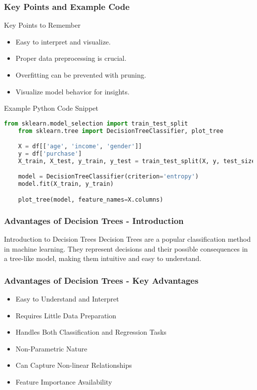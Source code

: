 \documentclass[aspectratio=169]{beamer}
\begin{document}
\begin{frame}[fragile]
    \frametitle{Key Points and Example Code}
    \begin{block}{Key Points to Remember}
        \begin{itemize}
            \item Easy to interpret and visualize.
            \item Proper data preprocessing is crucial.
            \item Overfitting can be prevented with pruning.
            \item Visualize model behavior for insights.
        \end{itemize}
    \end{block}

    \begin{block}{Example Python Code Snippet}
    \begin{lstlisting}[language=Python]
    from sklearn.model_selection import train_test_split
    from sklearn.tree import DecisionTreeClassifier, plot_tree

    X = df[['age', 'income', 'gender']]
    y = df['purchase']
    X_train, X_test, y_train, y_test = train_test_split(X, y, test_size=0.3, random_state=42)

    model = DecisionTreeClassifier(criterion='entropy')
    model.fit(X_train, y_train)

    plot_tree(model, feature_names=X.columns)
    \end{lstlisting}
    \end{block}
\end{frame}

\begin{frame}[fragile]
    \frametitle{Advantages of Decision Trees - Introduction}
    \begin{block}{Introduction to Decision Trees}
        Decision Trees are a popular classification method in machine learning. They represent decisions and their possible consequences in a tree-like model, making them intuitive and easy to understand.
    \end{block}
\end{frame}

\begin{frame}[fragile]
    \frametitle{Advantages of Decision Trees - Key Advantages}
    \begin{itemize}
        \item Easy to Understand and Interpret
        \item Requires Little Data Preparation
        \item Handles Both Classification and Regression Tasks
        \item Non-Parametric Nature
        \item Can Capture Non-linear Relationships
        \item Feature Importance Availability
    \end{itemize}
\end{frame}
\end{document}
